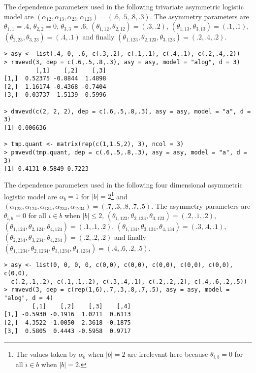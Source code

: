 \documentclass[11pt,a4paper]{article}
\begin{document}
The dependence parameters used in the following trivariate asymmetric logistic model are $(\alpha_{12},\alpha_{13},\alpha_{23},\alpha_{123})=(.6,.5,.8,.3)$.
The asymmetry parameters are $\theta_{1,1}=.4$, $\theta_{2,2}=0$, $\theta_{3,3}=.6$, $(\theta_{1,12},\theta_{2,12})=(.3,.2)$, $(\theta_{1,13},\theta_{3,13})=(.1,.1)$, $(\theta_{2,23},\theta_{3,23})=(.4,.1)$ and finally $(\theta_{1,123},\theta_{2,123},\theta_{3,123})=(.2,.4,.2)$.

\begin{verbatim}
> asy <- list(.4, 0, .6, c(.3,.2), c(.1,.1), c(.4,.1), c(.2,.4,.2))
> rmvevd(3, dep = c(.6,.5,.8,.3), asy = asy, model = "alog", d = 3)
         [,1]    [,2]    [,3]
[1,]  0.52375 -0.8844  1.4898
[2,]  1.16174 -0.4368 -0.7404
[3,] -0.03737  1.5139 -0.5996

> dmvevd(c(2, 2, 2), dep = c(.6,.5,.8,.3), asy = asy, model = "a", d = 3)
[1] 0.006636

> tmp.quant <- matrix(rep(c(1,1.5,2), 3), ncol = 3)
> pmvevd(tmp.quant, dep = c(.6,.5,.8,.3), asy = asy, model = "a", d = 3)
[1] 0.4131 0.5849 0.7223
\end{verbatim}

The dependence parameters used in the following four dimensional asymmetric logistic model are $\alpha_b = 1$ for $|b| = 2$\footnote{
The values taken by $\alpha_b$ when $|b| = 2$ are irrelevant here because $\theta_{i,b}=0$ for all $i \in b$ when $|b|=2$.} 
and $(\alpha_{123},\alpha_{124},\alpha_{134},\alpha_{234},\alpha_{1234})=(.7,.3,.8,.7,.5)$.
The asymmetry parameters are $\theta_{i,b}=0$ for all $i \in b$ when $|b|\leq2$, $(\theta_{1,123},\theta_{2,123},\theta_{3,123})=(.2,.1,.2)$, $(\theta_{1,124},\theta_{2,124},\theta_{4,124})=(.1,.1,.2)$, $(\theta_{1,134},\theta_{3,134},\theta_{4,134})=(.3,.4,.1)$, $(\theta_{2,234},\theta_{3,234},\theta_{4,234})=(.2,.2,.2)$ and finally $(\theta_{1,1234},\theta_{2,1234},\theta_{3,1234},\theta_{4,1234})=(.4,.6,.2,.5)$.    

\begin{verbatim}
> asy <- list(0, 0, 0, 0, c(0,0), c(0,0), c(0,0), c(0,0), c(0,0), c(0,0), 
  c(.2,.1,.2), c(.1,.1,.2), c(.3,.4,.1), c(.2,.2,.2), c(.4,.6,.2,.5))
> rmvevd(3, dep = c(rep(1,6),.7,.3,.8,.7,.5), asy = asy, model = "alog", d = 4)
        [,1]    [,2]    [,3]    [,4]
[1,] -0.5930 -0.1916  1.0211  0.6113
[2,]  4.3522 -1.0050  2.3618 -0.1875
[3,]  0.5805  0.4443 -0.5958  0.9717
\end{verbatim}

\end{document}

